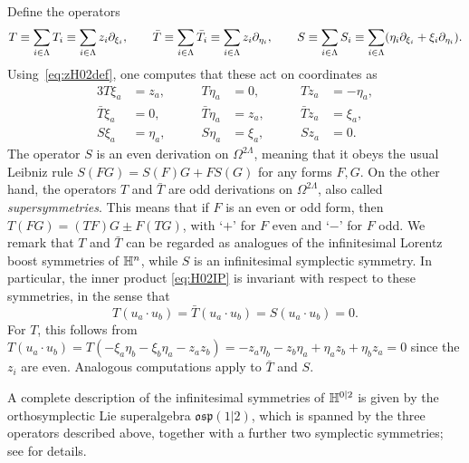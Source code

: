 \documentclass[11pt]{amsart}
\numberwithin{equation}{section}
\numberwithin{theorem}{section}
\begin{document}
Define the operators
\begin{equation}
  \label{e:T}
  T \equiv \sum_{i\in \Lambda} T_i \equiv \sum_{i\in \Lambda} z_i\partial_{\xi_i}, 
  \qquad 
  \bar{T} \equiv \sum_{i\in \Lambda} \bar{T}_i \equiv \sum_{i\in \Lambda} z_i \partial_{\eta_i},
  \qquad S \equiv \sum_{i\in\Lambda} S_i \equiv \sum_{i\in\Lambda}
  (\eta_i\partial_{\xi_i} + \xi_i \partial_{\eta_i}).
\end{equation}
Using~\eqref{eq:zH02def}, one computes that these act on
coordinates as
\begin{alignat}{3}
  T\xi_a &= z_a, &\qquad T\eta_a &= 0, &\qquad Tz_a &= -\eta_a,\\
  \bar{T}\xi_a &= 0, &\qquad \bar{T}\eta_a &= z_a, &\qquad \bar{T}z_a &= \xi_a,\\
  S\xi_a &= \eta_a, &\qquad S\eta_a &= \xi_a, &\qquad S z_a &= 0.
\end{alignat}
The operator $S$ is an even derivation on $\Omega^{2\Lambda}$, meaning that it obeys the usual Leibniz rule $S(FG) = S(F)G + FS(G)$ for any forms $F,G$. 
On the other hand, the operators $T$ and $\bar T$ are odd derivations on
$\Omega^{2\Lambda}$, also called \emph{supersymmetries}.  This means
that if $F$ is an even or odd form, then $T(FG) = (TF)G \pm F(TG)$,
with `$+$' for $F$ even and `$-$' for $F$ odd. We remark that $T$ and $\bar T$
can be regarded as analogues of the infinitesimal Lorentz boost symmetries
of $\mathbb{H}^{n}$, while $S$ is an infinitesimal symplectic symmetry.
In particular, the inner product \eqref{eq:H02IP} is
invariant with respect to these symmetries, in the sense that
\begin{equation} \label{e:uaubinv}
  T (u_a\cdot u_b)  = \bar T(u_a \cdot u_b) = S (u_a\cdot u_b) = 0.
\end{equation}
For $T$, this follows from
$T (u_a\cdot u_b) = T(-\xi_a\eta_b-\xi_b\eta_a-z_az_b) =
-z_a\eta_b-z_b\eta_a+\eta_az_b+\eta_bz_a=0$ since the $z_{i}$ are
even. Analogous computations apply to $\bar T$ and $S$.

A complete description of the infinitesimal symmetries of $\mathbb{H}^{0|2}$ is given by the orthosymplectic Lie superalgebra $\mathfrak{osp}(1|2)$, which is spanned by the three operators described above, together with a further two symplectic symmetries; see \cite[Section~7]{MR2110547} for details.
\end{document}
